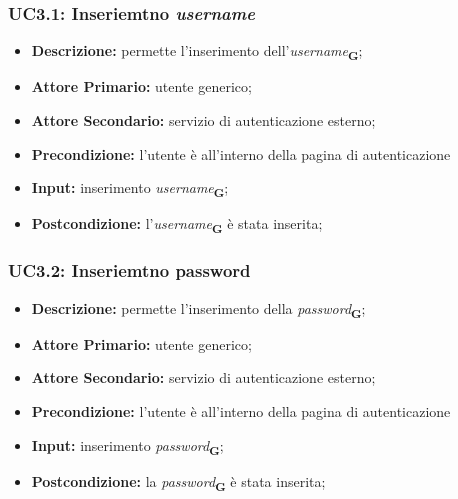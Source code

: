 \subsubsection{UC3.1: Inseriemtno \textit{username}}
\label{sec:UC3.1}
\begin{itemize}
    \item \textbf{Descrizione:} permette l'inserimento dell'\textit{username}\textsubscript{\textbf{G}};
    \item \textbf{Attore Primario:} utente generico;
    \item \textbf{Attore Secondario:} servizio di autenticazione esterno;
    \item \textbf{Precondizione:} l'utente è all'interno della pagina di autenticazione
    \item \textbf{Input:} inserimento \textit{username}\textsubscript{\textbf{G}};
    \item \textbf{Postcondizione:} l'\textit{username}\textsubscript{\textbf{G}} è stata inserita;
\end{itemize}
\subsubsection{UC3.2: Inseriemtno password}
\label{sec:UC3.2}
\begin{itemize}
    \item \textbf{Descrizione:} permette l'inserimento della \textit{password}\textsubscript{\textbf{G}};
    \item \textbf{Attore Primario:} utente generico;
    \item \textbf{Attore Secondario:} servizio di autenticazione esterno;
    \item \textbf{Precondizione:} l'utente è all'interno della pagina di autenticazione
    \item \textbf{Input:} inserimento \textit{password}\textsubscript{\textbf{G}};
    \item \textbf{Postcondizione:} la \textit{password}\textsubscript{\textbf{G}} è stata inserita;
\end{itemize}
